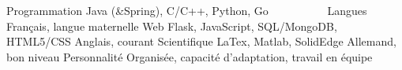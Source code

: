 

\begin{cvskillsF}  

  \cvskillF
    {Programmation} %
    {Java (\&Spring), C/C++, Python, Go} %
    {\ \ \ \ \ \ \ \ \ \ Langues} %
    {Français, langue maternelle} %
  \cvskillF
    {Web} %
    {Flask, JavaScript, SQL/MongoDB, HTML5/CSS} %
    {} %
    {Anglais, courant} %
  \cvskillF
    {Scientifique} %
    {LaTex, Matlab, SolidEdge} %
    {} %
    {Allemand, bon niveau} %
  \cvskillF
    {} %
    {} %
    {Personnalité} %
    {Organisée, capacité d'adaptation, travail en équipe} %
\end{cvskillsF}
